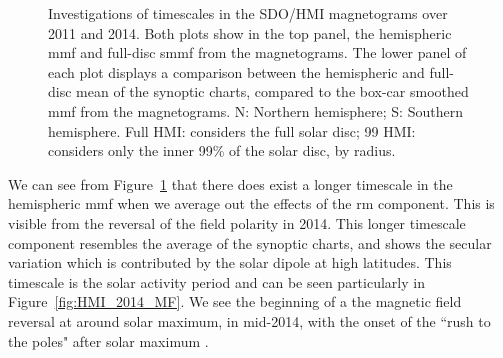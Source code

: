 \begin{figure}[!ht]
	\centering
	\qquad
	\caption{Investigations of timescales in the SDO/HMI magnetograms over 2011 and 2014. Both plots show in the top panel, the hemispheric \gls{mmf} and full-disc \gls{smmf} from the magnetograms. The lower panel of each plot displays a comparison between the hemispheric and full-disc mean of the synoptic charts, compared to the box-car smoothed \gls{mmf} from the magnetograms. N: Northern hemisphere; S: Southern hemisphere. Full HMI: considers the full solar disc; 99 HMI: considers only the inner 99\% of the solar disc, by radius.}
	\label{fig:HMI_MF_vs_synoptics}
\end{figure}

We can see from Figure~\ref{fig:HMI_MF_vs_synoptics} that there does exist a longer timescale in the hemispheric \gls{mmf} when we average out the effects of the \gls{rm} component. This is visible from the reversal of the field polarity in 2014. This longer timescale component resembles the average of the synoptic charts, and shows the secular variation which is contributed by the solar dipole at high latitudes. This timescale is the solar activity period and can be seen particularly in Figure~\ref{fig:HMI_2014_MF}. We see the beginning of a the magnetic field reversal at around solar maximum, in mid-2014, with the onset of the ``rush to the poles" after solar maximum \citep{wilson_solar_1994, mcintosh_what_2019}.

